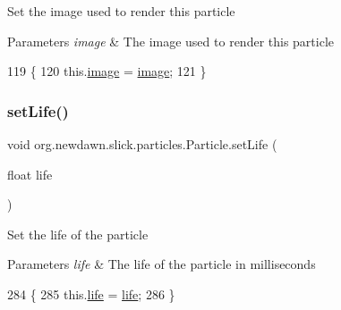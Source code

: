 Set the image used to render this particle


\begin{DoxyParams}{Parameters}
{\em image} & The image used to render this particle \\
\hline
\end{DoxyParams}

\begin{DoxyCode}
119                                       \{
120         this.\mbox{\hyperlink{classorg_1_1newdawn_1_1slick_1_1particles_1_1_particle_a1d154fcb0fa4f99035f4faff21919ec9}{image}} = \mbox{\hyperlink{classorg_1_1newdawn_1_1slick_1_1particles_1_1_particle_a1d154fcb0fa4f99035f4faff21919ec9}{image}};
121     \}
\end{DoxyCode}
\mbox{\label{classorg_1_1newdawn_1_1slick_1_1particles_1_1_particle_a9ef44ea7b2ecae6493368a6619bdadd7}} 
\subsubsection{\texorpdfstring{set\+Life()}{setLife()}}
{\footnotesize\ttfamily void org.\+newdawn.\+slick.\+particles.\+Particle.\+set\+Life (\begin{DoxyParamCaption}\item[{float}]{life }\end{DoxyParamCaption})\hspace{0.3cm}{\ttfamily [inline]}}

Set the life of the particle


\begin{DoxyParams}{Parameters}
{\em life} & The life of the particle in milliseconds \\
\hline
\end{DoxyParams}

\begin{DoxyCode}
284                                     \{
285         this.\mbox{\hyperlink{classorg_1_1newdawn_1_1slick_1_1particles_1_1_particle_a361d2a9d01b66d38d90496c096970aab}{life}} = \mbox{\hyperlink{classorg_1_1newdawn_1_1slick_1_1particles_1_1_particle_a361d2a9d01b66d38d90496c096970aab}{life}};
286     \}
\end{DoxyCode}
\mbox{\label{classorg_1_1newdawn_1_1slick_1_1particles_1_1_particle_aff280f67ae5c5e59da6ae0378bef065c}} 
